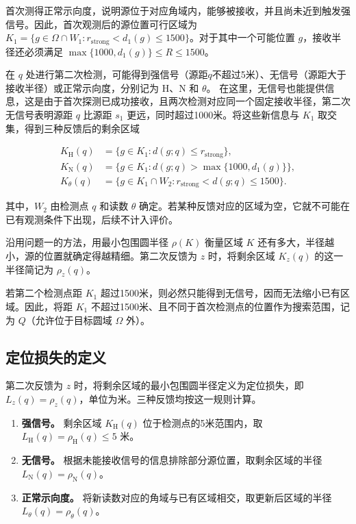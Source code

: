 \documentclass[UTF8,a4paper,zihao=-4,fontset=none]{ctexart}
\begin{document}
首次测得正常示向度，说明源位于对应角域内，能够被接收，并且尚未近到触发强信号。因此，首次观测后的源位置可行区域为 \(K_1=\{g\in\Omega\cap W_1:r_{\mathrm{strong}}<d_1(g)\le1500\}\)。对于其中一个可能位置 \(g\)，接收半径还必须满足 \(\max\{1000,d_1(g)\}\le R\le1500\)。

在 \(q\) 处进行第二次检测，可能得到强信号（源距\(q\)不超过5米）、无信号（源距大于接收半径）或正常示向度，分别记为 \(\mathrm H\)、\(\mathrm N\) 和 \(\theta\)。
在这里，无信号也能提供信息，这是由于首次探测已成功接收，且两次检测对应同一个固定接收半径，第二次无信号表明源距 \(q\) 比源距 \(s_1\) 更远，同时超过1000米。将这些新信息与 \(K_1\) 取交集，得到三种反馈后的剩余区域

\begin{equation}
\begin{aligned}
K_{\mathrm H}(q)&=\{g\in K_1:d(g;q)\le r_{\mathrm{strong}}\},\\
K_{\mathrm N}(q)&=\{g\in K_1:d(g;q)>\max\{1000,d_1(g)\}\},\\
K_\theta(q)&=\{g\in K_1\cap W_2:r_{\mathrm{strong}}<d(g;q)\le1500\}.
\end{aligned}
\label{eq:q2-pair-regions}
\end{equation}

其中，\(W_2\) 由检测点 \(q\) 和读数 \(\theta\) 确定。若某种反馈对应的区域为空，它就不可能在已有观测条件下出现，后续不计入评价。

沿用问题一的方法，用最小包围圆半径 \(\rho(K)\) 衡量区域 \(K\) 还有多大，半径越小，源的位置就确定得越精细。第二次反馈为 \(z\) 时，将剩余区域 \(K_z(q)\) 的这一半径简记为 \(\rho_z(q)\)。

若第二个检测点距 \(K_1\) 超过1500米，则必然只能得到无信号，因而无法缩小已有区域。因此，将距 \(K_1\) 不超过1500米、且不同于首次检测点的位置作为搜索范围，记为 \(Q\)（允许位于目标圆域 \(\Omega\) 外）。

\subsection{定位损失的定义}

第二次反馈为 \(z\) 时，将剩余区域的最小包围圆半径定义为定位损失，即 \(L_z(q)=\rho_z(q)\)，单位为米。三种反馈均按这一规则计算。

\begin{enumerate}[label=(\arabic*),leftmargin=2.2em]
  \item \textbf{强信号。} 剩余区域 \(K_{\mathrm H}(q)\) 位于检测点的5米范围内，取 \(L_{\mathrm H}(q)=\rho_{\mathrm H}(q)\le5\) 米。
  \item \textbf{无信号。} 根据未能接收信号的信息排除部分源位置，取剩余区域的半径 \(L_{\mathrm N}(q)=\rho_{\mathrm N}(q)\)。
  \item \textbf{正常示向度。} 将新读数对应的角域与已有区域相交，取更新后区域的半径 \(L_\theta(q)=\rho_\theta(q)\)。
\end{enumerate}
\end{document}
